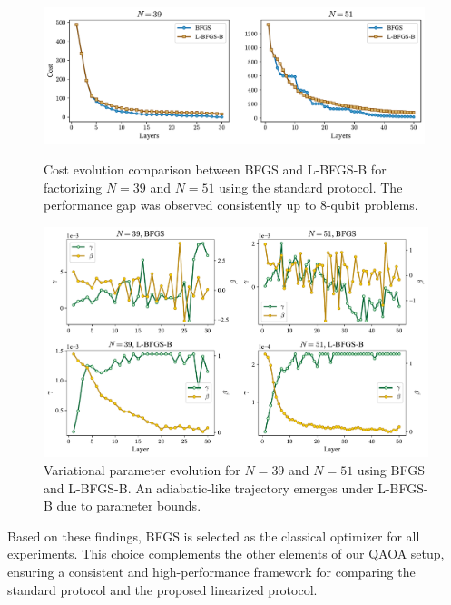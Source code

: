 \begin{figure}[h]
    \centering
    \includegraphics[width=0.99\textwidth]{03-methodology/figs/optimizer_comparison.pdf}
    \caption{Cost evolution comparison between BFGS and L-BFGS-B for factorizing $N=39$ and $N=51$ using the standard protocol. The performance gap was observed consistently up to 8-qubit problems.}
    \label{fig:optimizer_comparison}
    \includegraphics[width=1\textwidth]{03-methodology/figs/optimizer_parameters_comparison.pdf}
    \caption{Variational parameter evolution for $N=39$ and $N=51$ using BFGS and L-BFGS-B. An adiabatic-like trajectory emerges under L-BFGS-B due to parameter bounds.}
    \label{fig:optimizer_parameter_comparison}
\end{figure}

Based on these findings, BFGS is selected as the classical optimizer for all experiments.  
This choice complements the other elements of our QAOA setup, ensuring a consistent and high-performance framework for comparing the standard protocol and the proposed linearized protocol.